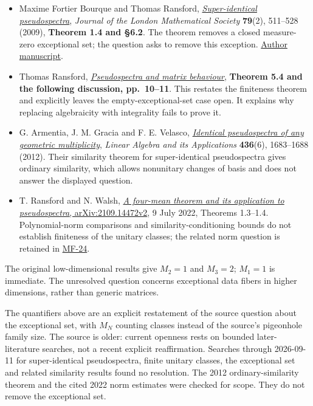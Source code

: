 \documentclass[11pt,a4paper]{article}
\makeatletter
\providecommand{\tightlist}{\setlength{\itemsep}{0pt}\setlength{\parskip}{0pt}}
\renewcommand{\subsection}{\Needspace{4\baselineskip}\@startsection{subsection}{2}{0pt}{9pt plus 1pt minus 1pt}{3pt}{\sffamily\bfseries\normalsize\color{ink}}}
\makeatother
\begin{document}
\begin{itemize}
\tightlist
\item
  Maxime Fortier Bourque and Thomas Ransford,
  \href{https://doi.org/10.1112/jlms/jdn085}{\emph{Super-identical
  pseudospectra}}, \emph{Journal of the London Mathematical Society}
  \textbf{79}(2), 511--528 (2009), \textbf{Theorem 1.4 and §6.2}. The
  theorem removes a closed measure-zero exceptional set; the question
  asks to remove this exception.
  \href{https://analyse.mat.ulaval.ca/abstracts/2008-03.pdf}{Author
  manuscript}.
\item
  Thomas Ransford,
  \href{https://analyse.mat.ulaval.ca/abstracts/2010-01.pdf}{\emph{Pseudospectra
  and matrix behaviour}}, \textbf{Theorem 5.4 and the following
  discussion, pp.~10--11}. This restates the finiteness theorem and
  explicitly leaves the empty-exceptional-set case open. It explains why
  replacing algebraicity with integrality fails to prove it.
\item
  G. Armentia, J. M. Gracia and F. E. Velasco,
  \href{https://doi.org/10.1016/j.laa.2011.01.014}{\emph{Identical
  pseudospectra of any geometric multiplicity}}, \emph{Linear Algebra
  and its Applications} \textbf{436}(6), 1683--1688 (2012). Their
  similarity theorem for super-identical pseudospectra gives ordinary
  similarity, which allows nonunitary changes of basis and does not
  answer the displayed question.
\item
  T. Ransford and N. Walsh,
  \href{https://arxiv.org/pdf/2109.14472v2}{\emph{A four-mean theorem
  and its application to pseudospectra}, arXiv:2109.14472v2}, 9 July
  2022, Theorems 1.3--1.4. Polynomial-norm comparisons and
  similarity-conditioning bounds do not establish finiteness of the
  unitary classes; the related norm question is retained in
  \href{https://github.com/ajt60gaibb/OpenProblemsInNLA/blob/main/matrix-functions-and-stability/MF-24/README.md}{MF-24}.
\end{itemize}

The original low-dimensional results give \(M_2=1\) and \(M_3=2\);
\(M_1=1\) is immediate. The unresolved question concerns exceptional
data fibers in higher dimensions, rather than generic matrices.

\subsection{Scope and status check}\label{scope-and-status-check}

The quantifiers above are an explicit restatement of the source question
about the exceptional set, with \(M_N\) counting classes instead of the
source's pigeonhole family size. The source is older: current openness
rests on bounded later-literature searches, not a recent explicit
reaffirmation. Searches through 2026-09-11 for super-identical
pseudospectra, finite unitary classes, the exceptional set and related
similarity results found no resolution. The 2012 ordinary-similarity
theorem and the cited 2022 norm estimates were checked for scope. They
do not remove the exceptional set.
\end{document}
